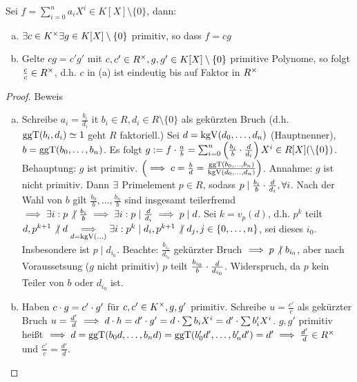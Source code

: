 \documentclass[a4paper]{report}
\begin{document}
\begin{lemm} Sei $f = \sum_{i=0}^n a_{i}X^{i} \in K[X] \setminus \{0\}$, dann:
  \begin{enumerate}[(a)]
    \item $\exists c \in K^\times \exists g \in K[X] \setminus \{0\}$ primitiv, so dass $f = cg$
          \item Gelte $cg = c'g'$ mit $c, c' \in R^\times, g, g' \in K[X] \setminus \{0\}$ primitive Polynome, so folgt $\frac cc \in R^\times$, d.h. $c$ in (a) ist eindeutig bis auf Faktor in $R^\times$
  \end{enumerate}
\begin{proof}{Beweis}
  \begin{enumerate}[(a)]
    \item Schreibe $a_{i} = \frac {b_{i}}{d_{i}}$ it $b_{i} \in R, d_{i} \in R \setminus \{0\}$ als gekürzten Bruch (d.h. $\operatorname{ggT}(b_{i}, d_{i}) \simeq 1$ geht $R$ faktoriell.) \newline
          Sei $d = \operatorname{kgV}(d_{0}, \ldots, d_{n})$ (Hauptnenner), $b = \operatorname{ggT}(b_{0}, \ldots, b_{n})$. Es folgt $g:= f \cdot \frac ab = \sum_{i=0}^n \left( \frac{b_{i}}b \cdot \frac d {d_{i}} \right)X^{i} \in R[X] (\setminus \{0\})$.\newline
          Behauptung: $g$ ist primitiv. $\left(\implies c= \frac bd = \frac{\operatorname{ggT}(b_{0}, ..., b_{n})}{\operatorname{kgV}(d_{0}, ..., d_{n})}\right)$.\newline
          Annahme: $g$ ist nicht primitiv. Dann $\exists$ Primelement $p \in R$, sodass $p \mid \frac {b_{i}}b \cdot \frac d{d_{i}}, \forall i$. Nach der Wahl von $b$ gilt $\frac {b_{0}}b, \ldots ,\frac {b_{n}}b$ sind insgesamt teilerfremd $\implies \exists i : p \not |\  \frac {b_{i}}b \implies \exists i : p \mid \frac d{d_{i}} \implies p \mid d$. Sei $k = v_{p}(d)$, d.h. $p^{k}$ teilt $d, p^{k+1} \not | \ d \underset{d = \operatorname{kgV}(...)} {\implies} \exists i : p^{k} \mid d_{i}, p^{k+1} \not | \ d_{j}, j \in \{0, \ldots, n\}$, sei dieses $i_{0}$. Insbesondere ist $p \mid d_{i_{0}}$.\newline
          Beachte: $\frac {b_{i_{0}}}{d_{i_{0}}}$ gekürzter Bruch $\imp p \not | \ b_{i_{0}}$, aber nach Voraussetsung ($g$ nicht primitiv) $p$ teilt $\frac{b_{i_{0}}} b \cdot \frac d{d_{i_{0}}}$. Widerspruch, da $p$ kein Teiler von $b$ oder $d_{i_{0}}$ ist.
    \item Haben $c \cdot g = c' \cdot g'$ für $c, c' \in K^\times, g,g'$ primitiv. Schreibe $u = \frac {c'}c$ als gekürzter Bruch $u = \frac {d'}d \implies d \cdot h = d' \cdot g' = d \cdot \sum b_{i}X^{i} = d' \cdot \sum b_{i}'X^{i}$. $g, g'$ primitiv heißt $\implies d = \operatorname{ggT}(b_{0}d, \ldots, b_{n}d) = \operatorname{ggT}(b'_{0}d', \ldots, b'_{n}d') = d' \implies \frac {d'}d \in R^\times$ und $\frac{c'}c = \frac{d'}d.$
  \end{enumerate}

\end{proof}

\end{lemm}
\end{document}
